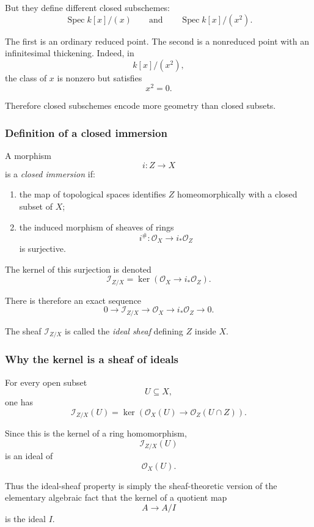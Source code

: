 But they define different closed subschemes:
\[
\operatorname{Spec} k[x]/(x)
\qquad\text{and}\qquad
\operatorname{Spec} k[x]/(x^2).
\]

The first is an ordinary reduced point. The second is a nonreduced point with an infinitesimal thickening. Indeed, in
\[
k[x]/(x^2),
\]
the class of \(x\) is nonzero but satisfies
\[
x^2=0.
\]

Therefore closed subschemes encode more geometry than closed subsets.

\subsubsection{Definition of a closed immersion}

A morphism
\[
i:Z\longrightarrow X
\]
is a \emph{closed immersion} if:

\begin{enumerate}[label=\arabic*.]
	\item the map of topological spaces identifies \(Z\) homeomorphically with a closed subset of \(X\);
	\item the induced morphism of sheaves of rings
	\[
	i^\#:\mathcal{O}_X\longrightarrow i_*\mathcal{O}_Z
	\]
	is surjective.
\end{enumerate}

The kernel of this surjection is denoted
\[
\mathcal{I}_{Z/X}
=
\ker\!\left(
\mathcal{O}_X\longrightarrow i_*\mathcal{O}_Z
\right).
\]

There is therefore an exact sequence
\[
0
\longrightarrow
\mathcal{I}_{Z/X}
\longrightarrow
\mathcal{O}_X
\longrightarrow
i_*\mathcal{O}_Z
\longrightarrow
0.
\]

The sheaf \(\mathcal{I}_{Z/X}\) is called the \emph{ideal sheaf} defining \(Z\) inside \(X\).

\subsubsection{Why the kernel is a sheaf of ideals}

For every open subset
\[
U\subseteq X,
\]
one has
\[
\mathcal{I}_{Z/X}(U)
=
\ker\!\left(
\mathcal{O}_X(U)
\longrightarrow
\mathcal{O}_Z(U\cap Z)
\right).
\]

Since this is the kernel of a ring homomorphism,
\[
\mathcal{I}_{Z/X}(U)
\]
is an ideal of
\[
\mathcal{O}_X(U).
\]

Thus the ideal-sheaf property is simply the sheaf-theoretic version of the elementary algebraic fact that the kernel of a quotient map
\[
A\longrightarrow A/I
\]
is the ideal \(I\).

